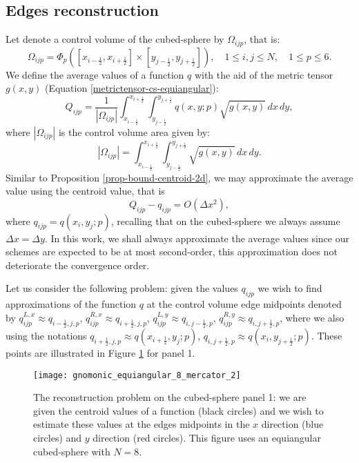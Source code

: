 \subsection{Edges reconstruction}
\label{cs-recon}
Let denote a control volume of the cubed-sphere by $\Omega_{ijp}$, that is:
\begin{equation*}
	\Omega_{ijp} = \Phi_p([x_{i-\frac{1}{2}}, x_{i+\frac{1}{2}}] \times [y_{j-\frac{1}{2}}, y_{j+\frac{1}{2}}]),
	\quad 1 \leq i, j \leq N, \quad 1 \leq p \leq 6.
\end{equation*}
We define the average values of a function $q$ with the aid of the metric tensor $g(x,y)$ (Equation \ref{metrictensor-cs-equiangular}):
\begin{equation*}
	Q_{ijp} = \frac{1}{|\Omega_{ijp}|}\int_{x_{i-\frac{1}{2}}}^{x_{i+\frac{1}{2}}}
	\int_{y_{j-\frac{1}{2}}}^{y_{j+\frac{1}{2}}}  q(x,y;p) \sqrt{g(x,y)}\,dx \,dy,
\end{equation*}
where $|\Omega_{ijp}|$ is the control volume area given by:
\begin{equation*}
	|\Omega_{ijp}| = \int_{x_{i-\frac{1}{2}}}^{x_{i+\frac{1}{2}}} \int_{y_{j-\frac{1}{2}}}^{y_{j+\frac{1}{2}}}\sqrt{g(x,y)} \,dx \,dy.
\end{equation*}
Similar to Proposition \ref{prop-bound-centroid-2d}, we may approximate the average value using the centroid value, that is
\begin{equation*}
	Q_{ijp} - q_{ijp} = O(\Delta x ^2), 
\end{equation*}
where $q_{ijp} = q(x_i,y_j; p)$, recalling that on the cubed-sphere we always assume $\Delta x = \Delta y$.
In this work, we shall always approximate the average values since our schemes are expected to be at most second-order,
this approximation does not deteriorate the convergence order.

Let us consider the following problem: given the values $q_{ijp}$ we wish to find approximations of 
the function $q$ at the control volume edge midpoints denoted by
$q^{L,x}_{ijp}  \approx q_{{i-\frac{1}{2}},j,p}$,
$q^{R,x}_{ijp}  \approx q_{{i+\frac{1}{2}},j,p}$,
$q^{L,y}_{ijp}  \approx q_{i,{j-\frac{1}{2}},p}$,
$q^{R,y}_{ijp}  \approx q_{i,{j+\frac{1}{2}},p}$, where we also using the notations
$q_{{i+\frac{1}{2}},j,p}  \approx q(x_{i+\frac{1}{2}},y_j; p)$,
$q_{i,{j+\frac{1}{2}},p}  \approx q(x_i,y_{j+\frac{1}{2}}; p)$.
These points are illustrated in Figure \ref{csgrid-rpoints} for panel 1.
\begin{figure}[!htb]
	\centering
	\texttt{[image: gnomonic\_equiangular\_8\_mercator\_2]}
	\caption{The reconstruction problem on the cubed-sphere panel 1: we are given the centroid values of a function (black circles)
		and we wish to estimate these values at the edges midpoints in the $x$ direction (blue circles) and $y$ direction (red circles).
		This figure uses an equiangular cubed-sphere with $N=8$.} \label{csgrid-rpoints}
\end{figure}

